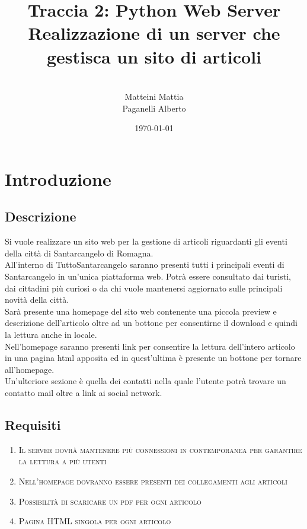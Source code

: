 \documentclass[a4paper,12pt]{report}
\title{\textbf{Traccia 2: Python Web Server}
Realizzazione di un server che gestisca un sito di articoli}
\author{
\\Matteini Mattia
\\Paganelli Alberto
}
\date{\today}
\begin{document}
\maketitle

\tableofcontents


\chapter{Introduzione}

\section{Descrizione}
Si vuole realizzare un sito web per la gestione di articoli riguardanti gli eventi della città di Santarcangelo di Romagna.
\\
All’interno di TuttoSantarcangelo saranno presenti tutti i principali eventi di Santarcangelo in un'unica piattaforma web. Potrà essere consultato dai turisti, dai cittadini più curiosi o da chi vuole mantenersi aggiornato sulle principali novità della città.
\\
Sarà presente una homepage del sito web contenente una piccola preview e descrizione dell’articolo oltre ad un bottone per consentirne il download e quindi la lettura anche in locale.
\\
Nell’homepage saranno presenti link per consentire la lettura dell’intero articolo in una pagina html apposita ed in quest’ultima è presente un bottone per tornare all’homepage.
\\
Un'ulteriore sezione è quella dei contatti nella quale l’utente potrà trovare un contatto mail oltre a link ai social network. 


\section{Requisiti}

\begin{enumerate}
    \item \textsc{Il server dovrà mantenere più connessioni in contemporanea per garantire la lettura a più utenti}
    \item \textsc{Nell’homepage dovranno essere presenti dei collegamenti agli articoli}
    \item \textsc{Possibilità di scaricare un pdf per ogni articolo}
    \item \textsc{Pagina HTML singola per ogni articolo}
\end{enumerate}
 
\end{document}

